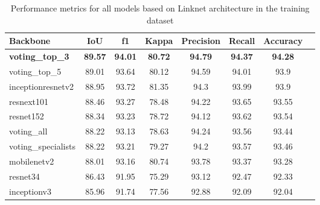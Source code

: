 \begin{table}[H]
    \centering
    \caption[Performance of all models based on Linknet
        architecture in the training dataset]{Performance metrics for all
        models
        based on Linknet
        architecture in the training dataset}
    \label{tab:metrics-train}
    \begin{tabular}{lccccccc}
        \toprule
        Backbone                & IoU            & f1             & Kappa
                                & Precision      & Recall         &
        Accuracy
        \\
        \midrule
        \textbf{voting\_top\_3} & \textbf{89.57} & \textbf{94.01} &
        \textbf{80.72}          & \textbf{94.79} & \textbf{94.37} &
        \textbf{94.28}                                                    \\
        voting\_top\_5          & 89.01          & 93.64          & 80.12
                                & 94.59          & 94.01          & 93.9
        \\
        inceptionresnetv2       & 88.95          & 93.72          & 81.35
                                & 94.3           & 93.99          & 93.9
        \\
        resnext101              & 88.46          & 93.27          & 78.48
                                & 94.22          & 93.65          & 93.55
        \\
        resnet152               & 88.34          & 93.23          & 78.72
                                & 94.12          & 93.62          & 93.54
        \\
        voting\_all             & 88.22          & 93.13          & 78.63
                                & 94.24          & 93.56          & 93.44
        \\
        voting\_specialists     & 88.22          & 93.21          & 79.27
                                & 94.2           & 93.57          &
        93.46
        \\
        mobilenetv2             & 88.01          & 93.16          & 80.74
                                & 93.78          & 93.37          & 93.28
        \\
        resnet34                & 86.43          & 91.95          & 75.29
                                & 93.12          & 92.47          & 92.33
        \\
        inceptionv3             & 85.96          & 91.74          & 77.56
                                & 92.88          & 92.09          & 92.04

\end{tabular}
\end{table}
